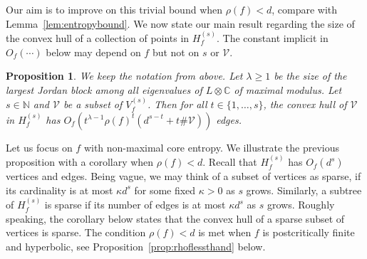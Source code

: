 \documentclass[12pt,oneside,a4]{amsart}
\newcommand{\IC}{\mathbb{C}}
\newcommand{\IN}{\mathbb{N}}
\newcommand{\cV}{\mathcal{V}}
\newcounter{maincounter}
\numberwithin{maincounter}{section}
\numberwithin{equation}{section}
\newtheorem{propo}[maincounter]{Proposition}
\begin{document}
Our aim is to improve on this trivial bound when $\rho(f)<d$, compare
with Lemma~\ref{lem:entropybound}. We now state our main result
regarding the size of the convex hull of a collection of points in
$H_f^{(s)}$. The constant implicit in $O_f(\cdots)$ below may depend on $f$ but not
on $s$ or $\cV$.

\begin{propo}
  \label{prop:treegrowthestimate}
  We keep the notation from above.
  Let $\lambda\ge 1$ be  the size of the largest Jordan block
  among all eigenvalues of $L\otimes\IC$ of maximal modulus. 
  Let $s\in\IN$ and  $\cV$ be a subset of $V_f^{(s)}$. Then for all
  $t\in \{1,\ldots,s\}$, the convex
  hull of $\cV$ in $H_f^{(s)}$ has 
  $O_f(t^{\lambda-1} \rho(f)^t (d^{s-t}+t \#\cV))$ edges.
\end{propo}

Let us focus on $f$ with non-maximal core entropy. 
We illustrate the previous proposition with a corollary 
when $\rho(f)<d$.
Recall that $H_f^{(s)}$ has $O_f(d^s)$ vertices and edges.
Being vague, we may think of a subset of  vertices as
sparse, if its cardinality is at most  $\kappa d^s$ for some fixed
$\kappa>0$ as $s$ grows.
Similarly, a subtree of $H_f^{(s)}$ is sparse if its number of edges
is at most $\kappa d^s$ as $s$ grows. 
Roughly speaking, the  corollary below states that 
the
convex hull of a sparse subset of vertices is sparse.
The condition $\rho(f)<d$ is met when $f$ is postcritically finite
and hyperbolic, see
Proposition~\ref{prop:rhoflessthand} below.
\end{document}
